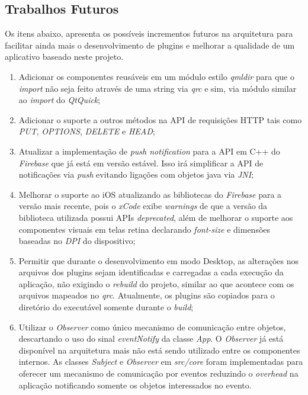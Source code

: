 \subsection{Trabalhos Futuros}
Os itens abaixo, apresenta os possíveis incrementos futuros na arquitetura para facilitar ainda mais o desenvolvimento de plugins e melhorar a qualidade de um aplicativo baseado neste projeto.

\begin{enumerate}
	\item Adicionar os componentes reusáveis em um módulo estilo \textit{qmldir} para que o \textit{import} não seja feito através de uma string via \textit{qrc} e sim, via módulo similar ao \textit{import} do \textit{QtQuick};

	\item Adicionar o suporte a outros métodos na API de requisições HTTP tais como \textit{PUT}, \textit{OPTIONS}, \textit{DELETE} e \textit{HEAD};

	\item Atualizar a implementação de \textit{push notification} para a API em C++ do \textit{Firebase} que já está em versão estável. Isso irá simplificar a API de notificações via \textit{push} evitando ligações com objetos java via \textit{JNI};

	\item Melhorar o suporte ao iOS atualizando as bibliotecas do \textit{Firebase} para a versão mais recente, pois o \textit{xCode} exibe \textit{warnings} de que a versão da biblioteca utilizada possui APIs \textit{deprecated}, além de melhorar o suporte aos componentes visuais em telas retina declarando \textit{font-size} e dimensões baseadas no \textit{DPI} do dispositivo;

	\item Permitir que durante o desenvolvimento em modo Desktop, as alterações nos arquivos dos plugins sejam identificadas e carregadas a cada execução da aplicação, não exigindo o \textit{rebuild} do projeto, similar ao que acontece com os arquivos mapeados no \textit{qrc}. Atualmente, os plugins são copiados para o diretório do executável somente durante o \textit{build};

	\item Utilizar o \textit{Observer} como único mecanismo de comunicação entre objetos, descartando o uso do sinal \textit{eventNotify} da classe \textit{App}. O \textit{Observer} já está disponível na arquitetura mais não está sendo utilizado entre os componentes internos. As classes \textit{Subject} e \textit{Observer} em \textit{src/core} foram implementadas para oferecer um mecanismo de comunicação por eventos reduzindo o \textit{overhead} na aplicação notificando somente os objetos interessados no evento.
\end{enumerate}